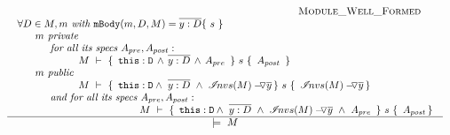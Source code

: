 $
\\ \\
\begin{array}{l}
\inferruleSD {  ~ \strut \hspace{3cm} {\sc{Module\_Well\_Formed}}}
{
\begin{array}{l} 
\forall  D\in M,  m   \textit{ with } \prg{mBody}(m,D,M)=\overline{y:D}\{\  s \ \}      \\
        ~ \strut \hspace{0.5cm} m \textit{ private}  \\ 
            ~ \strut \hspace{0.9cm} \textit{ for all its  specs } A_{pre},  A_{post}:\\ 
             ~\strut \hspace{2cm}
 					   {\hproves{M} { \ \prg{this}:\prg{D}\, \wedge\, \overline{y:D}\, \wedge\, A_{pre}\  } {\ s\ } {\ A_{post} \ } }\\
      ~ \strut \hspace{0.5cm} m \textit{ public}  \\ 
           ~ \strut \hspace{2cm}  { \hproves {M} {\ \prg{this}:\prg{D} \wedge\ \overline{y:D}   \ \wedge \ \PushAS {y} {\extract{M} } } {\ s\ } {\ \PushAS {y}{\extract{M}} } } \\
        ~ \strut \hspace{0.9cm} \textit{ and for all its  specs } A_{pre},  A_{post}:\\ 
             ~\strut \hspace{2cm}   
              ~ \strut \hspace{2cm}  { \hproves {M} {\ \prg{this}:\prg{D} \wedge\ \overline{y:D}  \ \wedge \ \PushAS {y} {\extract{M} } \ \wedge \ A_{pre}\ } {\ s\ } {\ A_{post} }  }
\end{array}
}					  					  
{   
	\ \models\ M \ 
}
\end{array}
$


